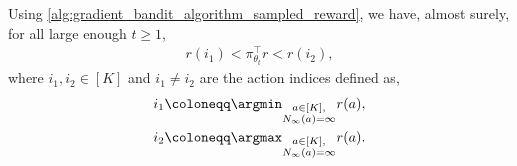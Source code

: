 \begin{lemma}
\label{lem:expected_reward_range}
Using \cref{alg:gradient_bandit_algorithm_sampled_reward}, we have, almost surely, for all large enough $t \ge 1$,
\begin{align}
\label{eq:expected_reward_range_claim_1}
    r(i_1) < \pi_{\theta_t}^\top r < r(i_2),
\end{align}
where $i_1, i_2 \in [K]$ and $i_1 \ne i_2$ are the action indices defined as,
\begin{align}
\label{eq:expected_reward_range_claim_2a}
    i_1 &\coloneqq \argmin_{\substack{a \in [K], \\ N_\infty(a) = \infty}} r(a), \\
\label{eq:expected_reward_range_claim_2b}
    i_2 &\coloneqq \argmax_{\substack{a \in [K], \\ N_\infty(a) = \infty}} r(a).
\end{align}
\end{lemma}
